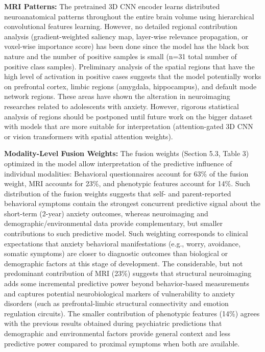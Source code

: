 \documentclass[10pt,letterpaper]{article}
\begin{document}
                                                                                                                          \textbf{MRI Patterns:} The pretrained 3D CNN encoder learns distributed neuroanatomical patterns throughout the
entire brain volume using hierarchical convolutional features learning. However, no detailed
regional contribution analysis (gradient-weighted saliency map, layer-wise relevance
propagation, or voxel-wise importance score) has been done since the model has the black box
nature and the number of positive samples is small (n=31 total number of positive class
samples). Preliminary analysis of the spatial regions that have the high level of activation in
positive cases suggests that the model potentially works on prefrontal cortex, limbic regions
(amygdala, hippocampus), and default mode network regions. These areas have shown the
alteration in neuroimaging researches related to adolescents with anxiety. However, rigorous
statistical analysis of regions should be postponed until future work on the bigger dataset with
models that are more suitable for interpretation (attention-gated 3D CNN or vision
transformers with spatial attention weights).

                                                                                                                          \textbf{Modality-Level Fusion Weights:} The fusion weights (Section 5.3, Table 3) optimized in the model allow interpretation of the predictive influence of individual modalities: Behavioral questionnaires account for 63\% of the fusion weight, MRI accounts for 23\%, and phenotypic features account for 14\%. Such distribution of the fusion weights suggests that self- and parent-reported behavioral symptoms contain the strongest concurrent predictive signal about the short-term (2-year) anxiety outcomes, whereas neuroimaging and demographic/environmental data provide complementary, but smaller contributions to such predictive model. Such weighting corresponds to clinical expectations that anxiety behavioral manifestations (e.g., worry, avoidance, somatic symptoms) are closer to diagnostic outcomes than biological or demographic factors at this stage of development. The considerable, but not predominant contribution of MRI (23\%) suggests that structural neuroimaging adds some incremental predictive power beyond behavior-based measurements and captures potential neurobiological markers of vulnerability to anxiety disorders (such as prefrontal-limbic structural connectivity and emotion regulation circuits). The smaller contribution of phenotypic features (14\%) agrees with the previous results obtained during psychiatric predictions that demographic and environmental factors provide general context and less predictive power compared to proximal symptoms when both are available.
\end{document}
